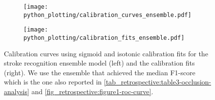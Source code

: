\begin{figure}
    \begin{subfigure}[c]{0.48\columnwidth}
        \centering
        \texttt{[image: python\_plotting/calibration\_curves\_ensemble.pdf]}
    \end{subfigure}
    \begin{subfigure}[c]{0.48\columnwidth}
        \centering
        \texttt{[image: python\_plotting/calibration\_fits\_ensemble.pdf]}
    \end{subfigure}
    \caption[Calibration fits and curves for the stroke recognition model using Platt-scaling and isotonic regression for calibration.]{%
        Calibration curves using sigmoid and isotonic calibration fits for the stroke recognition ensemble model (left) and the calibration fits (right). 
        We use the ensemble that achieved the median F1-score which is the one also reported in \cref{tab_retrospective:table3-occlusion-analysis} and \cref{fig_retrospective:figure1-roc-curve}.}
    \label{fig_discussion:retrospective-paper-calibration-curve-sigmoid-isotonic}
\end{figure}










